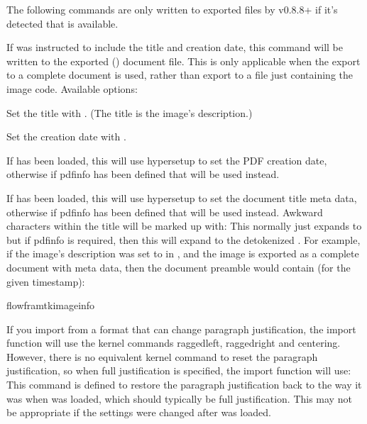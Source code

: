 \documentclass[fontsize=12pt]{scrbook}
\begin{document}
The following commands are only written to exported files by
 v0.8.8+ if it's detected that 
is available.


If  was instructed to include the title and creation
date, this command will be written to the exported () document file.
This is only applicable when the export to a complete document is used, rather than
export to a file just containing the image code.
Available options:

Set the title with .
(The title is the image's description.) 

Set the creation date with
.


If  has been loaded, this will use \gls{hypersetup} to
set the PDF creation date, otherwise if \gls{pdfinfo} has been
defined that will be used instead.


If  has been loaded, this will use \gls{hypersetup} to
set the document title meta data, otherwise if \gls{pdfinfo} has been
defined that will be used instead. Awkward characters within the
title will be marked up with:
This normally just expands to  but if \gls{pdfinfo} is
required, then this will expand to the detokenized . For example, if the image's description was set to
 in , and the image is
exported as a complete document with meta data, then the document
preamble would contain (for the given timestamp):
\begin{compactcodebox}
\gls{flowframtkimageinfo}
\end{compactcodebox}

If you import from a format that can change paragraph justification,
the import function will use the kernel commands \gls{raggedleft}, \gls{raggedright}
and \gls{centering}. However, there is no equivalent kernel command
to reset the paragraph justification, so when full justification is specified, the
import function will use:
This command is defined to restore the paragraph justification back
to the way it was when  was loaded, which
should typically be full justification. This may not be appropriate
if the settings were changed after  was loaded.
\end{document}
